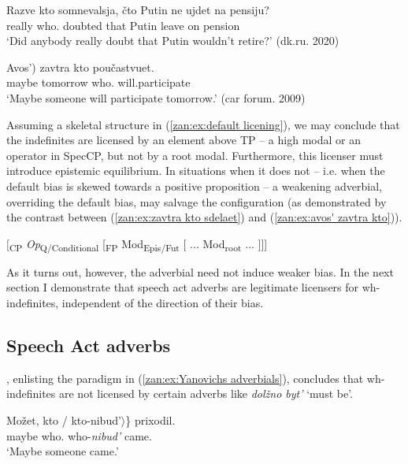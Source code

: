 \documentclass[output=paper,colorlinks,citecolor=brown]{langscibook}
\begin{document}
\ea
\ea \label{zan:ex:razve kto somnevalsja}
    \gll Razve kto somnevalsja, čto Putin ne ujdet na pensiju?\\
    really  who.{\INDF} doubted that Putin {\NEG} leave on pension\\
    \glt  `Did anybody really doubt that Putin wouldn't retire?'  \hfill {(dk.ru. 2020)}

\ex \label{zan:ex:avos' zavtra kto}
    \gll \minsp{*(} Avos') zavtra kto poučastvuet.\\
    {} maybe tomorrow who.{\INDF} will.participate\\
    \glt  `Maybe someone will participate tomorrow.' \hfill {(car forum. 2009)}
\z
\z

\noindent Assuming a skeletal structure in (\ref{zan:ex:default licening}), we may conclude that the indefinites are licensed by an element above TP -- a high modal or an operator in SpecCP, but not by a root modal. Furthermore, this licenser must introduce epistemic equilibrium. In situations when it does not -- i.e. when the default bias is skewed towards a positive proposition -- a weakening adverbial, overriding the default bias, may salvage the configuration (as demonstrated by the contrast between (\ref{zan:ex:zavtra kto sdelaet}) and (\ref{zan:ex:avos' zavtra kto})).     

\ea \label{zan:ex:default licening}
$[$\textsubscript{CP} \textit{Op}\textsubscript{Q/Conditional} [\textsubscript{FP} Mod\textsubscript{Epis/Fut}  [ ... Mod\textsubscript{root} ... ]]]
\z

\noindent As it turns out, however, the adverbial need not induce weaker bias. In the next section I demonstrate that speech act adverbs are legitimate licensers for wh-indefinites, independent of the direction of their bias.  

\subsection{Speech Act adverbs}\label{zan:subsec:SA phenomena}

\citet{yan2005}, enlisting the paradigm in (\ref{zan:ex:Yanovichs adverbials}), concludes that wh-indefinites are not licensed by certain adverbs like \textit{dolžno byt'} `must be'. 

\ea \label{zan:ex:Yanovichs adverbials}
\ea
        \gll Možet, \minsp{\{} kto / \minsp{$\langle$}  kto-nibud'$\rangle$\} prixodil. \\
      maybe {} who.{\INDF} {} {} {} who-\textit{nibud'} came.{\MASC}\\
      \glt `Maybe someone came.' 
\end{document}
